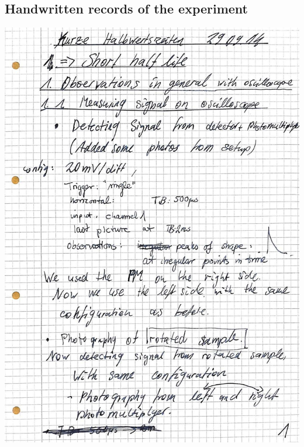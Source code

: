 \subsection{Handwritten records of the experiment}
\label{sec:appendix_records}
    \includegraphics[width=\linewidth]{records/page1.jpeg}
\clearpage


